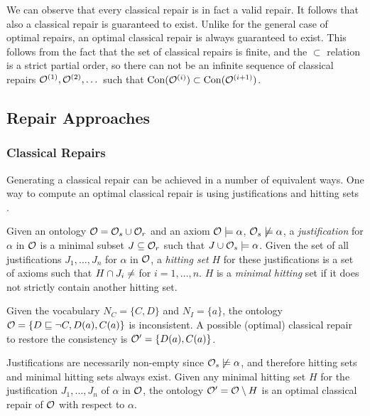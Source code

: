 We can observe that every classical repair is in fact a valid repair. It follows that also a classical repair is guaranteed to exist. Unlike for the general case of optimal repairs, an optimal classical repair is always guaranteed to exist. This follows from the fact that the set of classical repairs is finite, and the $\subset$ relation is a strict partial order, so there can not be an infinite sequence of classical repairs $\mathcal{O}^{(1)}, \mathcal{O}^{(2)}, \dots$  such that $\mathrm{Con}(\mathcal{O}^{(i)}) \subset \mathrm{Con}(\mathcal{O}^{(i + 1)})$.

\subsection{Repair Approaches} \label{repair-approaches}

\subsubsection{Classical Repairs} \label{classical-repairs}

Generating a classical repair can be achieved in a number of equivalent ways. One way to compute an optimal classical repair is using justifications and hitting sets \cite{reiter1987theory}.

\begin{definition}
  Given an ontology $\mathcal{O} = \mathcal{O}_s \cup \mathcal{O}_r$ and an axiom $\mathcal{O} \models \alpha$, $\mathcal{O}_s \not\models \alpha$, a \emph{justification} for $\alpha$ in $\mathcal{O}$ is a minimal subset $J \subseteq \mathcal{O}_r$ such that $J \cup \mathcal{O}_s \models \alpha$. Given the set of all justifications $J_1, \dots, J_n$ for $\alpha$ in $\mathcal{O}$, a \emph{hitting set} $H$ for these justifications is a set of axioms such that $H \cap J_i \not= \empty$ for $i = 1, \dots, n$. $H$ is a \emph{minimal hitting} set if it does not strictly contain another hitting set.
\end{definition}

\begin{example}
  Given the vocabulary $N_C = \{ C, D \}$ and $N_I = \{ a \}$, the ontology $\mathcal{O} = \{ D \sqsubseteq \lnot C, D(a), C(a) \}$ is inconsistent. A possible (optimal) classical repair to restore the consistency is $\mathcal{O}' = \{ D(a), C(a) \}$.
\end{example}

Justifications are necessarily non-empty since $\mathcal{O}_s \not\models \alpha$, and therefore hitting sets and minimal hitting sets always exist. Given any minimal hitting set $H$ for the justification $J_1, \dots, J_n$ of $\alpha$ in $\mathcal{O}$, the ontology $\mathcal{O}' = \mathcal{O} \setminus H$ is an optimal classical repair of $\mathcal{O}$ with respect to $\alpha$.

